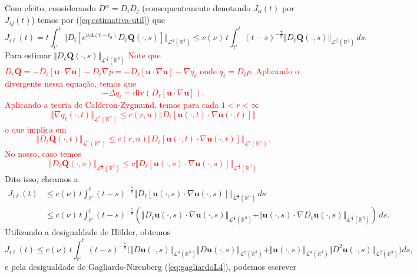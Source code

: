 \documentclass[a4paper, 11pt]{book}
\theoremstyle{definition}
\newcommand{\bR}{\mathbb{R}}
\newcommand{\bu}{\mathbf{u}}
\newcommand{\BQ}{\mathbf{Q}}
\newcommand{\cL}{\mathcal{L}}
\begin{document}
\begin{prf}
    Com efeito, considerando $D^\alpha = D_iD_j$ (consequentemente denotando $J_\alpha(t)$ por $J_{ij}(t)$) temos por (\ref{eq:estimativa-util}) que
    \[
        J_{i\ell}(t) = t\int_{t'}^t \Vert D_i [ e^{\nu \Delta (t-t_0)} D_\ell \BQ (\cdot,s) ] \Vert_{\cL^2(\bR^3)} \leqslant c(\nu) \, t \int_{t'}^t (t - s)^{-\frac{7}{8}} \Vert D_\ell \BQ(\cdot,s) \Vert_{\cL^{\frac{4}{3}}(\bR^3)} \,ds.
    \]
    Para estimar $\Vert D_\ell \BQ(\cdot,s) \Vert_{\cL^{\frac{4}{3}}(\bR^3)}$
    \textcolor{red}{
        Note que $D_\ell\BQ = - D_\ell [ \bu \cdot \nabla \bu] - D_\ell \nabla p = - D_\ell [\bu \cdot \nabla \bu] - \nabla q_\ell$ onde $q_\ell = D_\ell p$. Aplicando o divergente nessa equação, temos que
        \[
            -\Delta q_\ell = \mathrm{div} ( D_\ell [ \bu \cdot \nabla \bu]).
        \]
        Aplicando a teoria de Calderon-Zygmund, temos para cada $1 < r < \infty$
        \[
            \Vert \nabla q_\ell (\cdot,t) \Vert_{\cL^r(\bR^n)} \leqslant c(r,n) \Vert D_{\ell} [\bu(\cdot,t) \cdot \nabla\bu (\cdot,t) ] \Vert
        \]
        o que implica em
        \[
            \Vert D_\ell \BQ(\cdot,t) \Vert_{\cL^r(\bR^n)} \leqslant c(r,n) \Vert D_\ell[\bu(\cdot,t) \cdot \nabla\bu(\cdot,t)] \Vert_{\cL^r(\bR^n)}.  
        \]
        No nosso, caso temos
        \[
            \Vert D_\ell\BQ(\cdot,s) \Vert_{\cL^\frac{4}{3}(\bR^3)} \leqslant c \Vert D_{\ell} [\bu(\cdot,s) \cdot \nabla \bu(\cdot,s)] \Vert_{\cL^{\frac{4}{3}}(\bR^3)}
        \]
    }\!Dito isso, cheamos a
    \[
        \begin{aligned}
            J_{i\ell}(t) &\leqslant c(\nu) \, t \int_{t'}^t (t - s)^{-\frac{7}{8}} \Vert D_\ell [\bu(\cdot,s) \cdot \nabla \bu(\cdot,s)] \Vert_{\cL^\frac{4}{3}(\bR^3)} \,ds\\
            &\leqslant c(\nu) \, t \int_{t'}^t (t - s)^{-\frac{7}{8}} \left( \Vert D_{\ell} \bu(\cdot,s) \cdot \nabla \bu(\cdot,s) \Vert_{\cL^\frac{4}{3}(\bR^3)} + \Vert \bu(\cdot,s) \cdot \nabla D_\ell \bu(\cdot,s) \Vert_{\cL^\frac{4}{3}(\bR^3)} \right) \,ds. 
        \end{aligned}
    \]
    Utilizando a desigualdade de Hölder, obtemos
    \[
        J_{i\ell}(t) \leqslant c(\nu) \, t \! \int_{t'}^t \! (t - s)^{-\frac{7}{8}} \Big( \Vert D\bu(\cdot,s) \Vert_{\cL^4(\bR^3)} \Vert D\bu(\cdot,s) \Vert_{\cL^2(\bR^3)}+ \Vert \bu(\cdot,s) \Vert_{\cL^4(\bR^3)} \Vert D^2\bu(\cdot,s) \Vert_{\cL^2(\bR^3)} \Big) ds,
    \]
    e pela desigualdade de Gagliardo-Nirenberg (\ref{eq:gagliardoL4}), podemos escrever
    \[
        \begin{aligned}

\end{aligned}\]
\end{prf}
\end{document}
